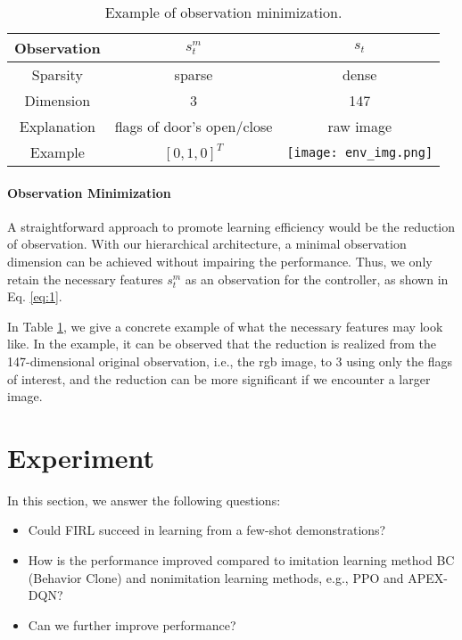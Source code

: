 \documentclass[conference]{IEEEtran}
\begin{document}
\begin{table}[h]
\caption{Example of observation minimization.}
\label{table:obs_example}
\begin{center}
\begin{tabular}{c||c|c}
\hline
Observation &\(s^{m}_{t}\) & \(s_t\) \\
\hline
Sparsity & sparse & dense \\
\hline
Dimension & 3 & 147 \\
\hline
Explanation & flags of door's open/close
& raw image \\
\hline
Example &
$[0,1,0]^T$
&
\begin{minipage}{.1\textwidth}
  \texttt{[image: env\_img.png]}
\end{minipage}\\
\hline
\end{tabular}
\end{center}
\end{table}

\paragraph{Observation Minimization}
A straightforward approach to promote learning efficiency would be the reduction of observation. With our hierarchical architecture, a minimal observation dimension can be achieved without impairing the performance. Thus, we only retain the necessary features $s^{m}_{t}$ as an observation for the controller, as shown in Eq. \ref{eq:1}.

In Table \ref{table:obs_example}, we give a concrete example of what the necessary features may look like. In the example, it can be observed that the reduction is realized from the 147-dimensional original observation, i.e., the rgb image, to 3 using only the flags of interest, and the reduction can be more significant if we encounter a larger image.

\section{Experiment}
In this section, we answer the following questions:
\begin{itemize}
\item Could FIRL succeed in learning from a few-shot demonstrations? 
\item How is the performance improved compared to imitation learning method BC (Behavior Clone) and nonimitation learning methods, e.g., PPO and APEX-DQN?
\item Can we further improve performance?
\end{itemize}
\end{document}
